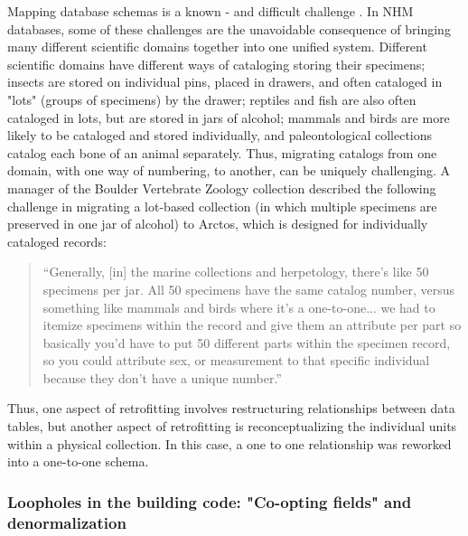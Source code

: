 Mapping database schemas is a known - and difficult challenge \cite{Batini_1986}. In NHM databases, some of these challenges are the unavoidable consequence of bringing many different scientific domains together into one unified system. Different scientific domains have different ways of cataloging storing their specimens; insects are stored on individual pins, placed in drawers, and often cataloged in "lots" (groups of specimens) by the drawer; reptiles and fish are also often cataloged in lots, but are stored in jars of alcohol; mammals and birds are more likely to be cataloged and stored individually, and paleontological collections catalog each bone of an animal separately. Thus, migrating catalogs from one domain, with one way of numbering, to another, can be uniquely challenging. A manager of the Boulder Vertebrate Zoology collection described the following challenge in migrating a lot-based collection (in which multiple specimens are preserved in one jar of alcohol) to Arctos, which is designed for individually cataloged records:
\begin{quote}
“Generally, [in] the marine collections and herpetology, there's like 50 specimens per jar. All 50 specimens have the same catalog number, versus something like mammals and birds where it's a one-to-one... we had to itemize specimens within the record and give them an attribute per part so basically you'd have to put 50 different parts within the specimen record, so you could attribute sex, or measurement to that specific individual because they don't have a unique number.”
\end{quote}
Thus, one aspect of retrofitting involves restructuring relationships between data tables, but another aspect of retrofitting is reconceptualizing the individual units within a physical collection. In this case, a one to one relationship was reworked into a one-to-one schema.

\subsubsection{Loopholes in the building code: "Co-opting fields" and denormalization }

